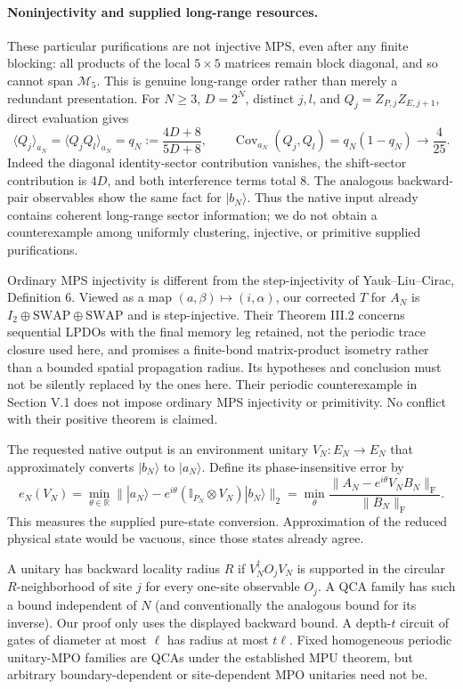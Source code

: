\documentclass[11pt]{article}
\newcommand{\Id}{\mathbb I}
\newcommand{\F}{\mathrm F}
\begin{document}
\paragraph{Noninjectivity and supplied long-range resources.}
These particular purifications are not injective MPS, even after any finite blocking: all products of the local $5\times5$ matrices remain block diagonal, and so cannot span $\mathcal M_5$. This is genuine long-range order rather than merely a redundant presentation. For $N\ge3$, $D=2^N$, distinct $j,l$, and $Q_j=Z_{P,j}Z_{E,j+1}$, direct evaluation gives
\[
 \langle Q_j\rangle_{a_N}=\langle Q_jQ_l\rangle_{a_N}
 =q_N:=\frac{4D+8}{5D+8},\qquad
 \operatorname{Cov}_{a_N}(Q_j,Q_l)=q_N(1-q_N)\longrightarrow\frac4{25}.
\]
Indeed the diagonal identity-sector contribution vanishes, the shift-sector contribution is $4D$, and both interference terms total $8$. The analogous backward-pair observables show the same fact for $|b_N\rangle$. Thus the native input already contains coherent long-range sector information; we do not obtain a counterexample among uniformly clustering, injective, or primitive supplied purifications.

Ordinary MPS injectivity is different from the step-injectivity of Yauk--Liu--Cirac, Definition 6. Viewed as a map $(a,\beta)\mapsto(i,\alpha)$, our corrected $T$ for $A_N$ is $I_2\oplus\mathrm{SWAP}\oplus\mathrm{SWAP}$ and is step-injective. Their Theorem III.2 concerns sequential LPDOs with the final memory leg retained, not the periodic trace closure used here, and promises a finite-bond matrix-product isometry rather than a bounded spatial propagation radius. Its hypotheses and conclusion must not be silently replaced by the ones here. Their periodic counterexample in Section V.1 does not impose ordinary MPS injectivity or primitivity. No conflict with their positive theorem is claimed.

The requested native output is an environment unitary $V_N:E_N\to E_N$ that approximately converts $|b_N\rangle$ to $|a_N\rangle$. Define its phase-insensitive error by
\[
 e_N(V_N)=\min_{\theta\in\mathbb R}
 \big\||a_N\rangle-e^{i\theta}(\Id_{P_N}\otimes V_N)|b_N\rangle\big\|_2
 =\min_\theta\frac{\|A_N-e^{i\theta}V_NB_N\|_\F}{\|B_N\|_\F}.
\]
This measures the supplied pure-state conversion. Approximation of the reduced physical state would be vacuous, since those states already agree.

A unitary has backward locality radius $R$ if $V_N^\dagger O_jV_N$ is supported in the circular $R$-neighborhood of site $j$ for every one-site observable $O_j$. A QCA family has such a bound independent of $N$ (and conventionally the analogous bound for its inverse). Our proof only uses the displayed backward bound. A depth-$t$ circuit of gates of diameter at most $\ell$ has radius at most $t\ell$. Fixed homogeneous periodic unitary-MPO families are QCAs under the established MPU theorem, but arbitrary boundary-dependent or site-dependent MPO unitaries need not be.
\end{document}
